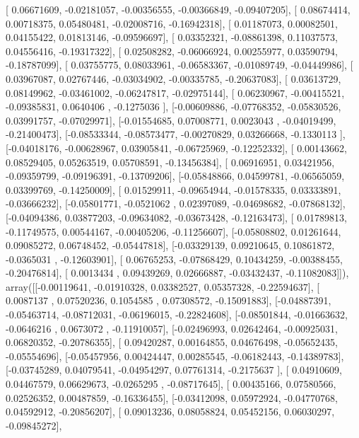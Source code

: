 \documentclass{article}
\begin{document}
       [ 0.06671609, -0.02181057, -0.00356555, -0.00366849, -0.09407205],
       [ 0.08674414,  0.00718375,  0.05480481, -0.02008716, -0.16942318],
       [ 0.01187073,  0.00082501,  0.04155422,  0.01813146, -0.09596697],
       [ 0.03352321, -0.08861398,  0.11037573,  0.04556416, -0.19317322],
       [ 0.02508282, -0.06066924,  0.00255977,  0.03590794, -0.18787099],
       [ 0.03755775,  0.08033961, -0.06583367, -0.01089749, -0.04449986],
       [ 0.03967087,  0.02767446, -0.03034902, -0.00335785, -0.20637083],
       [ 0.03613729,  0.08149962, -0.03461002, -0.06247817, -0.02975144],
       [ 0.06230967, -0.00415521, -0.09385831,  0.0640406 , -0.1275036 ],
       [-0.00609886, -0.07768352, -0.05830526,  0.03991757, -0.07029971],
       [-0.01554685,  0.07008771,  0.0023043 , -0.04019499, -0.21400473],
       [-0.08533344, -0.08573477, -0.00270829,  0.03266668, -0.1330113 ],
       [-0.04018176, -0.00628967,  0.03905841, -0.06725969, -0.12252332],
       [ 0.00143662,  0.08529405,  0.05263519,  0.05708591, -0.13456384],
       [ 0.06916951,  0.03421956, -0.09359799, -0.09196391, -0.13709206],
       [-0.05848866,  0.04599781, -0.06565059,  0.03399769, -0.14250009],
       [ 0.01529911, -0.09654944, -0.01578335,  0.03333891, -0.03666232],
       [-0.05801771, -0.0521062 ,  0.02397089, -0.04698682, -0.07868132],
       [-0.04094386,  0.03877203, -0.09634082, -0.03673428, -0.12163473],
       [ 0.01789813, -0.11749575,  0.00544167, -0.00405206, -0.11256607],
       [-0.05808802,  0.01261644,  0.09085272,  0.06748452, -0.05447818],
       [-0.03329139,  0.09210645,  0.10861872, -0.0365031 , -0.12603901],
       [ 0.06765253, -0.07868429,  0.10434259, -0.00388455, -0.20476814],
       [ 0.0013434 ,  0.09439269,  0.02666887, -0.03432437, -0.11082083]]), array([[-0.00119641, -0.01910328,  0.03382527,  0.05357328, -0.22594637],
       [ 0.0087137 ,  0.07520236,  0.1054585 ,  0.07308572, -0.15091883],
       [-0.04887391, -0.05463714, -0.08712031, -0.06196015, -0.22824608],
       [-0.08501844, -0.01663632, -0.0646216 ,  0.0673072 , -0.11910057],
       [-0.02496993,  0.02642464, -0.00925031,  0.06820352, -0.20786355],
       [ 0.09420287,  0.00164855,  0.04676498, -0.05652435, -0.05554696],
       [-0.05457956,  0.00424447,  0.00285545, -0.06182443, -0.14389783],
       [-0.03745289,  0.04079541, -0.04954297,  0.07761314, -0.2175637 ],
       [ 0.04910609,  0.04467579,  0.06629673, -0.0265295 , -0.08717645],
       [ 0.00435166,  0.07580566,  0.02526352,  0.00487859, -0.16336455],
       [-0.03412098,  0.05972924, -0.04770768,  0.04592912, -0.20856207],
       [ 0.09013236,  0.08058824,  0.05452156,  0.06030297, -0.09845272],
\end{document}

